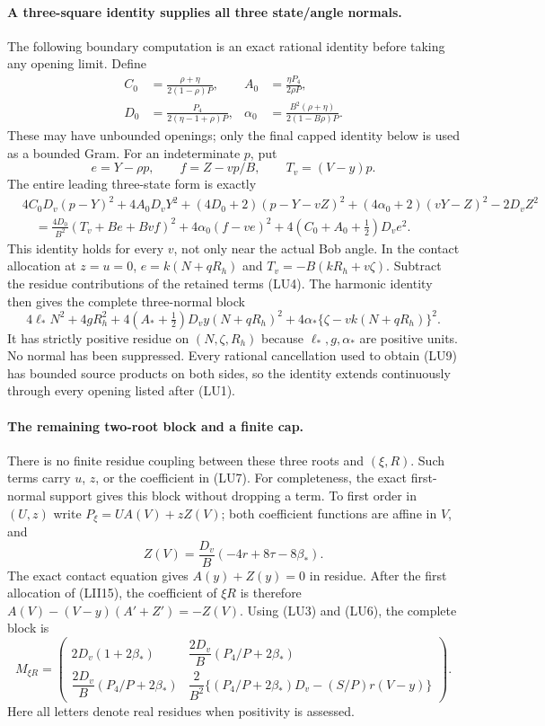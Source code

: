 \paragraph{A three-square identity supplies all three state/angle normals.}
The following boundary computation is an exact rational identity
before taking any opening limit.  Define
\[
\begin{aligned}
 C_0&=\frac{\rho+\eta}{2(1-\rho)P},&
 A_0&=\frac{\eta P_4}{2\rho P},\\
 D_0&=\frac{P_4}{2(\eta-1+\rho)P},&
 \alpha_0&=\frac{B^2(\rho+\eta)}{2(1-B\rho)P}.
\end{aligned}
\]
These may have unbounded openings; only the final capped identity
below is used as a bounded Gram.  For an indeterminate $p$, put
\[
 e=Y-\rho p,\qquad f=Z-vp/B,\qquad T_v=(V-y)p.
\]
The entire leading three-state form is exactly
\[
\begin{split}
 &4C_0D_v(p-Y)^2+4A_0D_vY^2
 +(4D_0+2)(p-Y-vZ)^2+(4\alpha_0+2)(vY-Z)^2-2D_vZ^2\\
 &\quad=\frac{4D_0}{B^2}(T_v+Be+Bvf)^2
       +4\alpha_0(f-ve)^2+4(C_0+A_0+\tfrac12)D_ve^2.
\end{split}                                                    \tag{LU8}
\]
This identity holds for every $v$, not only near the actual Bob
angle.  In the contact allocation at $z=u=0$,
$e=k(N+qR_h)$ and $T_v=-B(kR_h+v\zeta)$.
Subtract the residue contributions of the retained terms (LU4).
The harmonic identity then gives the complete three-normal block
\[
 \boxed{4\ell_*N^2+4gR_h^2
 +4(A_*+\tfrac12)D_vy(N+qR_h)^2
 +4\alpha_*\{\zeta-vk(N+qR_h)\}^2.}                     \tag{LU9}
\]
It has strictly positive residue on $(N,\zeta,R_h)$ because
$\ell_*,g,\alpha_*$ are positive units.  No normal has been
suppressed.  Every rational cancellation used to obtain (LU9)
has bounded source products on both sides, so the identity extends
continuously through every opening listed after (LU1).

\paragraph{The remaining two-root block and a finite cap.}
There is no finite residue coupling between these three roots and
$(\xi,R)$.  Such terms carry $u$, $z$, or the coefficient in (LU7).
For completeness, the exact first-normal support gives this block
without dropping a term.  To first order in $(U,z)$ write
$P_\xi=UA(V)+zZ(V)$; both coefficient functions are affine in $V$,
and
\[
 Z(V)=\frac{D_v}{B}(-4r+8\tau-8\beta_*).
\]
The exact contact equation gives $A(y)+Z(y)=0$ in residue.
After the first allocation of (LII15), the coefficient of $\xi R$
is therefore $A(V)-(V-y)(A'+Z')=-Z(V)$.
Using (LU3) and (LU6), the complete block is
\[
 M_{\xi R}=
 \begin{pmatrix}
 2D_v(1+2\beta_*)&\dfrac{2D_v}{B}(P_4/P+2\beta_*)\\[1mm]
 \dfrac{2D_v}{B}(P_4/P+2\beta_*)&
 \dfrac2{B^2}\{(P_4/P+2\beta_*)D_v-(S/P)r(V-y)\}
 \end{pmatrix}.                                           \tag{LU10}
\]
Here all letters denote real residues when positivity is assessed.

